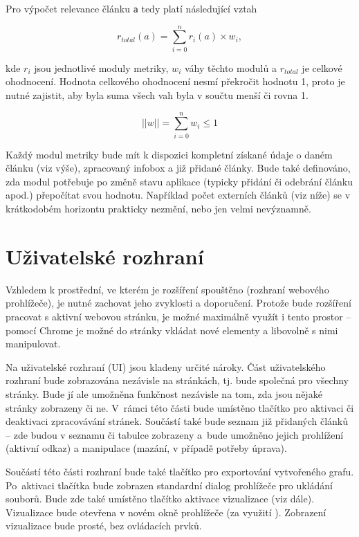 Pro výpočet relevance článku \texttt{a} tedy platí následující vztah

\begin{equation}
r_{total}(a) = \sum\limits_{i=0}^n r_{i}(a) \times w_{i},
\end{equation}

kde $r_{i}$ jsou jednotlivé moduly metriky, $w_{i}$ váhy těchto modulů a $r_{total}$ je celkové ohodnocení. Hodnota celkového ohodnocení nesmí překročit hodnotu 1, proto je nutné zajistit, aby byla suma všech vah byla v součtu menší či rovna 1.  

\begin{equation}
||w|| = \sum\limits_{i=0}^n w_{i} \leq 1
\end{equation} 

Každý modul metriky bude mít k dispozici kompletní získané údaje o daném článku (viz výše), zpracovaný infobox a již přidané články. Bude také definováno, zda modul potřebuje po změně stavu aplikace (typicky přidání či odebrání článku apod.) přepočítat svou hodnotu. Například počet externích článků (viz níže) se v krátkodobém horizontu prakticky nezmění, nebo jen velmi nevýznamně.

\section{Uživatelské rozhraní}
\label{label:ui}
Vzhledem k prostřední, ve kterém je rozšíření spouštěno (rozhraní webového prohlížeče), je nutné zachovat jeho zvyklosti a doporučení. Protože bude rozšíření pracovat s aktivní webovou stránku, je možné maximálně využít i tento prostor -- pomocí Chrome  je možné do stránky vkládat nové elementy a libovolně s nimi manipulovat.

Na uživatelské rozhraní (UI) jsou kladeny určité nároky. Část uživatelského rozhraní bude zobrazována nezávisle na stránkách, tj. bude společná pro všechny stránky. Bude jí ale umožněna funkčnost nezávisle na tom, zda jsou nějaké stránky zobrazeny či ne. V~rámci této části bude umístěno tlačítko pro aktivaci či deaktivaci zpracovávání stránek. Součástí také bude seznam již přidaných článků -- zde budou v seznamu či tabulce zobrazeny a~bude umožněno jejich prohlížení (aktivní odkaz) a manipulace (mazání, v případě potřeby úprava).

Součástí této části rozhraní bude také tlačítko pro exportování vytvořeného grafu. Po~aktivaci tlačítka bude zobrazen standardní dialog prohlížeče pro ukládání souborů. Bude zde také umístěno tlačítko aktivace vizualizace (viz dále). Vizualizace bude otevřena v novém okně prohlížeče (za využití ). Zobrazení vizualizace bude prosté, bez ovládacích prvků.

